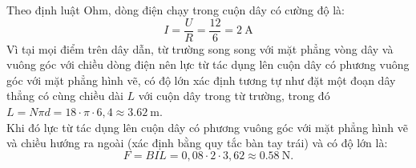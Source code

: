 \begin{ex}
{\begin{center}
	\end{center}
Theo định luật Ohm, dòng điện chạy trong cuộn dây có cường độ là:
$$
I=\frac{U}{R}=\frac{12}{6}=\SI{2}{\ampere}
$$
Vì tại mọi điểm trên dây dẫn, từ trường song song với mặt phẳng vòng dây và vuông góc với chiều dòng điện nên lực từ tác dụng lên cuộn dây có phương vuông góc với mặt phẳng hình vẽ, có độ lớn xác định tương tự như đặt một đoạn dây thẳng có cùng chiều dài $L$ với cuộn dây trong từ trường, trong đó $L=N \pi d=18 \cdot \pi \cdot 6,4 \approx \SI{3.62}{\meter}$.\\
Khi đó lực từ tác dụng lên cuộn dây có phương vuông góc với mặt phẳng hình vẽ và chiều hướng ra ngoài (xác định bằng quy tắc bàn tay trái) và có độ lớn là:
$$
F=B I L=0,08 \cdot 2 \cdot 3,62 \approx \SI{0.58}{\newton}.
$$
}
\end{ex}











